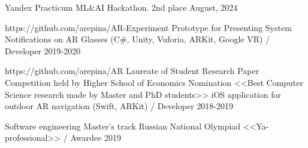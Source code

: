 \vspace{-0.5cm}

\begin{cventries}

\cventry
{} %
{Yandex Practicum ML\&AI Hackathon. 2nd place} %
{} %
{August, 2024} %

\cventry
{https://github.com/arepina/AR-Experiment
} %
{Prototype for Presenting System Notifications on AR Glasses (C\#, Unity, Vuforia, ARKit, Google VR) / Developer} %
{} %
{2019-2020} %

\cventry
{https://github.com/arepina/AR
	\newline Laureate of Student Research Paper Competition held by Higher School of Economics
	\newline Nomination <<Best Computer Science research made by Master and PhD students>>
} %
{iOS application for outdoor AR navigation  (Swift, ARKit) / Developer} %
{} %
{2018-2019} %

\cventry
{Software engineering Master's track} %
{Russian National Olympiad <<Ya-professional>> / Awardee} %
{} %
{2019} %

\end{cventries}
